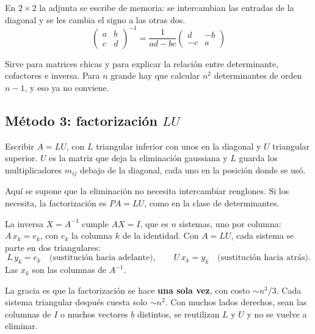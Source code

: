 \documentclass[11pt,letterpaper]{article}
\begin{document}
\begin{idea}
    En $2 \times 2$ la adjunta se escribe de memoria: se intercambian
    las entradas de la diagonal y se les cambia el signo a las otras
    dos.
    \[
        \begin{pmatrix} a & b \\ c & d \end{pmatrix}^{-1}
        = \frac{1}{ad - bc}
        \begin{pmatrix} d & -b \\ -c & a \end{pmatrix}
    \]
\end{idea}

Sirve para matrices chicas y para explicar la relación entre
determinante, cofactores e inversa. Para $n$ grande hay que calcular
$n^2$ determinantes de orden $n - 1$, y eso ya no conviene.


\subsection*{Método 3: factorización $LU$}

\begin{definicion}[Factorización $LU$]
    Escribir $A = LU$, con $L$ triangular inferior con unos en la
    diagonal y $U$ triangular superior. $U$ es la matriz que deja la
    eliminación gaussiana y $L$ guarda los multiplicadores $m_{ij}$
    debajo de la diagonal, cada uno en la posición donde se usó.
\end{definicion}

Aquí se supone que la eliminación no necesita intercambiar renglones.
Si los necesita, la factorización es $PA = LU$, como en la clase de
determinantes.

La inversa $X = A^{-1}$ cumple $AX = I$, que es $n$ sistemas, uno por
columna: $A\,x_k = e_k$, con $e_k$ la columna $k$ de la identidad.
Con $A = LU$, cada sistema se parte en dos triangulares:
\[
    L\,y_k = e_k \quad \text{(sustitución hacia adelante)} ,
    \qquad
    U\,x_k = y_k \quad \text{(sustitución hacia atrás)} .
\]
Las $x_k$ son las columnas de $A^{-1}$.

\begin{idea}
    La gracia es que la factorización se hace \textbf{una sola vez},
    con costo $\sim n^3/3$. Cada sistema triangular después cuesta
    solo $\sim n^2$. Con muchos lados derechos, sean las columnas de
    $I$ o muchos vectores $b$ distintos, se reutilizan $L$ y $U$ y no
    se vuelve a eliminar.
\end{idea}
\end{document}

